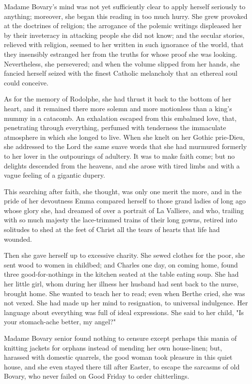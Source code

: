 \documentclass{tufte-book}
\begin{document}
Madame Bovary's mind was not yet sufficiently clear to apply herself
seriously to anything; moreover, she began this reading in too much
hurry. She grew provoked at the doctrines of religion; the arrogance
of the polemic writings displeased her by their inveteracy in attacking
people she did not know; and the secular stories, relieved with
religion, seemed to her written in such ignorance of the world, that
they insensibly estranged her from the truths for whose proof she was
looking. Nevertheless, she persevered; and when the volume slipped
from her hands, she fancied herself seized with the finest Catholic
melancholy that an ethereal soul could conceive.

As for the memory of Rodolphe, she had thrust it back to the bottom of
her heart, and it remained there more solemn and more motionless than
a king's mummy in a catacomb. An exhalation escaped from this embalmed
love, that, penetrating through everything, perfumed with tenderness the
immaculate atmosphere in which she longed to live. When she knelt on her
Gothic prie-Dieu, she addressed to the Lord the same suave words that
she had murmured formerly to her lover in the outpourings of adultery.
It was to make faith come; but no delights descended from the heavens,
and she arose with tired limbs and with a vague feeling of a gigantic
dupery.

This searching after faith, she thought, was only one merit the more,
and in the pride of her devoutness Emma compared herself to those grand
ladies of long ago whose glory she, had dreamed of over a portrait of La
Valliere, and who, trailing with so much majesty the lace-trimmed trains
of their long gowns, retired into solitudes to shed at the feet of
Christ all the tears of hearts that life had wounded.

Then she gave herself up to excessive charity. She sewed clothes for the
poor, she sent wood to women in childbed; and Charles one day, on coming
home, found three good-for-nothings in the kitchen seated at the table
eating soup. She had her little girl, whom during her illness her
husband had sent back to the nurse, brought home. She wanted to teach
her to read; even when Berthe cried, she was not vexed. She had made
up her mind to resignation, to universal indulgence. Her language about
everything was full of ideal expressions. She said to her child, "Is
your stomach-ache better, my angel?"

Madame Bovary senior found nothing to censure except perhaps this mania
of knitting jackets for orphans instead of mending her own house-linen;
but, harassed with domestic quarrels, the good woman took pleasure in
this quiet house, and she even stayed there till after Easter, to escape
the sarcasms of old Bovary, who never failed on Good Friday to order
chitterlings.
\end{document}

